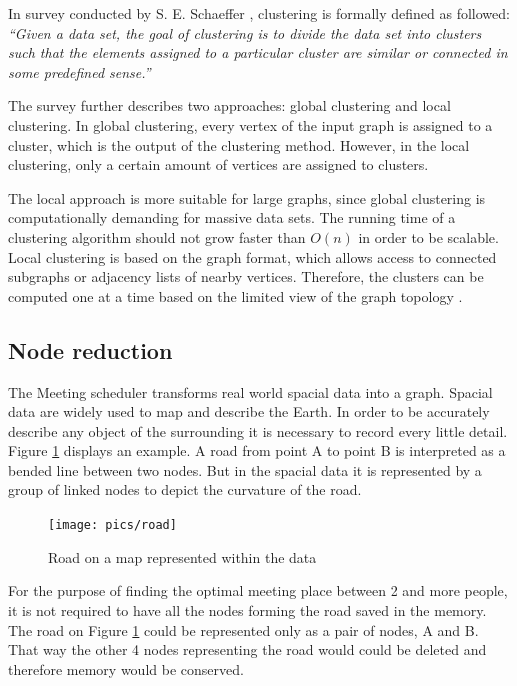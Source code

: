 \documentclass[thesis=M,english]{FITthesis}[2012/10/20]
\begin{document}
In survey conducted by S. E. Schaeffer \cite{Schaeffer07}, clustering is formally defined as followed: \textit{``Given a data set, the goal of clustering is to divide the data set into clusters such that the elements assigned to a particular cluster are similar or connected in some predefined sense.''}

The survey further describes two approaches: global clustering and local clustering. In global clustering, every vertex of the input graph is assigned to a cluster, which is the output of the clustering method. However, in the local clustering, only a certain amount of vertices are assigned to clusters. 

The local approach is more suitable for large graphs, since global clustering is computationally demanding for massive data sets. The running time of a clustering algorithm should not grow faster than $O(n)$ in order to be scalable. Local clustering is based on the graph format, which allows access to connected subgraphs or adjacency lists of nearby vertices. Therefore, the clusters can be computed one at a time based on the limited view of the graph topology \cite{Schaeffer07}.




\subsection{Node reduction}
\label{sec:NodeReduction}
The Meeting scheduler transforms real world spacial data into a graph. Spacial data are widely used to map and describe the Earth. In order to be accurately describe any object of the surrounding it is necessary to record every little detail. Figure \ref{pic:Road} displays an example. A road from point A to point B is interpreted as a bended line between two nodes. But in the spacial data it is represented by a group of linked nodes to depict the curvature of the road.

\begin{figure}[H]
\centering
\texttt{[image: pics/road]}
\caption{Road on a map represented within the data}
\label{pic:Road}
\end{figure}

For the purpose of finding the optimal meeting place between 2 and more people, it is not required to have all the nodes forming the road saved in the memory. The road on Figure \ref{pic:Road} could be represented only as a pair of nodes, A and B. That way the other 4 nodes representing the road would could be deleted and therefore memory would be conserved. 
\end{document}
